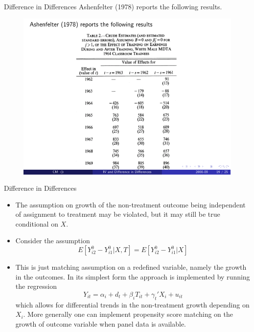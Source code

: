 \begin{frame}{Difference in Differences}
Ashenfelter (1978) reports the following results.
\begin{figure}
\centering
\includegraphics[scale=.85]{./resources/ashefelter2.pdf}
\end{figure}
\end{frame}

\begin{frame}{Difference in Differences}
\begin{itemize}
\item The assumption on growth of the non-treatment outcome being independent of assignment to treatment may be violated, but it may still be true conditional on $X$.
\item Consider the assumption
$$ E[Y_{i2}^0- Y_{i1}^0 | X,T] = E[Y_{i2}^0- Y_{i1}^0 | X] $$ 
\item This is just matching assumption on a redefined variable, namely the growth in the outcomes. In its simplest form the approach is implemented by running the regression
$$ Y_{it} = \alpha_i + d_t + \beta_i T_{it} + \gamma_t' X_i + u_{it}$$ 
which allows for differential trends in the non-treatment growth depending on $X_i$. More generally one can implement propensity score matching on the growth of outcome variable when panel data is available.
\end{itemize}
\end{frame}

